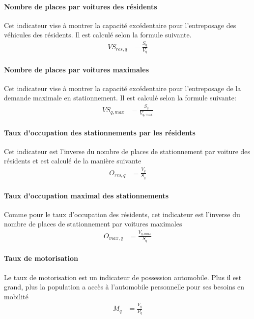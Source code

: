             \paragraph{Nombre de places par voitures des résidents} Cet indicateur vise à montrer la capacité excédentaire pour l'entreposage des véhicules des résidents. Il est calculé selon la formule suivante. 
            \begin{align}
                VS_{res,q} &= \frac{S_q}{V_q}\label{eq:stat-voit}
            \end{align}
            \paragraph{Nombre de places par voitures maximales} Cet indicateur vise à montrer la capacité excédentaire pour l'entreposage de la demande maximale en stationnement. Il est calculé selon la formule suivante:
            \begin{align}
                VS_{q,max} &=\frac{S_q}{V_{q,max}}\label{eq:stat-voit-max}
            \end{align}
            \paragraph{Taux d'occupation des stationnements par les résidents} Cet indicateur est l'inverse du nombre de places de stationnement par voiture des résidents et est calculé de la manière suivante
            \begin{align}
                O_{res,q} &= \frac{V_q}{S_q}
            \end{align}
            \paragraph{Taux d'occupation maximal des stationnements} Comme pour le taux d'occupation des résidents, cet indicateur est l'inverse du nombre de places de stationnement par voitures maximales
            \begin{align}
                O_{max,q} &= \frac{V_{q,max}}{S_q}
            \end{align}
            \paragraph{Taux de motorisation} Le taux de motorisation est un indicateur de possession automobile. Plus il est grand, plus la population a accès à l'automobile personnelle pour ses besoins en mobilité
            \begin{align}
                M_q &= \frac{V_q}{P_q} \label{eq:voit-par-pers}
            \end{align}
